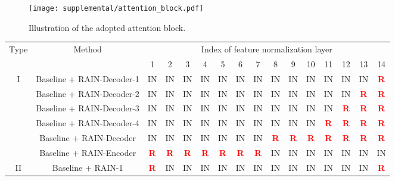 \documentclass[final]{cvpr}
\begin{document}
\begin{figure}[!htbp]
\begin{center}
\texttt{[image: supplemental/attention\_block.pdf]}\\
\end{center}
   \caption{Illustration of the adopted attention block. }
\label{fig:attention_block}
\end{figure}

\begin{table*}[!tp]
\small
\begin{center}
\begin{tabular}{|c|c|c|c|c|c|c|c|c|c|c|c|c|c|c|c|}
\hline
\multirow{2}{*}{Type} & \multirow{2}{*}{Method} & \multicolumn{14}{c|}{Index of feature normalization layer} \\
\cline{3-16}
& & 1 & 2 & 3 & 4 & 5 & 6 & 7 & 8 & 9 & 10 & 11 & 12 & 13 & 14 \\
\hline
\multirow{6}{*}{I}& Baseline + RAIN-Decoder-1 & IN & IN & IN & IN & IN & IN & IN & IN & IN & IN & IN & IN & IN & \textcolor{red}{\textbf{R}} \\
& Baseline + RAIN-Decoder-2 & IN & IN & IN & IN & IN & IN & IN & IN & IN & IN & IN & IN & \textcolor{red}{\textbf{R}} & \textcolor{red}{\textbf{R}} \\
& Baseline + RAIN-Decoder-3 & IN & IN & IN & IN & IN & IN & IN & IN & IN & IN & IN & \textcolor{red}{\textbf{R}} & \textcolor{red}{\textbf{R}} & \textcolor{red}{\textbf{R}} \\
& Baseline + RAIN-Decoder-4 & IN & IN & IN & IN & IN & IN & IN & IN & IN & IN & \textcolor{red}{\textbf{R}} & \textcolor{red}{\textbf{R}} & \textcolor{red}{\textbf{R}} & \textcolor{red}{\textbf{R}} \\
& Baseline + RAIN-Decoder & IN & IN & IN & IN & IN & IN & IN & \textcolor{red}{\textbf{R}} & \textcolor{red}{\textbf{R}} & \textcolor{red}{\textbf{R}} & \textcolor{red}{\textbf{R}} & \textcolor{red}{\textbf{R}} & \textcolor{red}{\textbf{R}} & \textcolor{red}{\textbf{R}} \\
& Baseline + RAIN-Encoder & \textcolor{red}{\textbf{R}} & \textcolor{red}{\textbf{R}} & \textcolor{red}{\textbf{R}} & \textcolor{red}{\textbf{R}} & \textcolor{red}{\textbf{R}} & \textcolor{red}{\textbf{R}} & \textcolor{red}{\textbf{R}} & IN & IN & IN & IN & IN & IN & IN\\
\hline\hline
\multirow{6}{*}{II}& Baseline + RAIN-1 & \textcolor{red}{\textbf{R}} & IN & IN & IN & IN & IN & IN & IN & IN & IN & IN & IN & IN & \textcolor{red}{\textbf{R}} \\

\end{tabular}
\end{center}
\end{table*}
\end{document}
